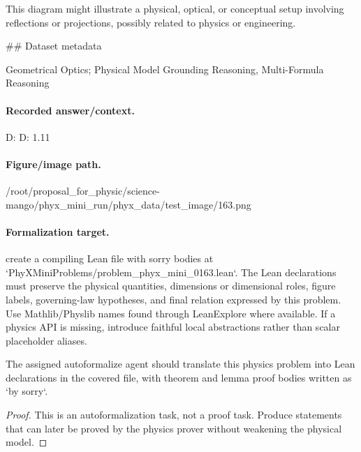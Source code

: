 This diagram might illustrate a physical, optical, or conceptual setup involving reflections or projections, possibly related to physics or engineering.

\#\# Dataset metadata

Geometrical Optics; Physical Model Grounding Reasoning, Multi-Formula Reasoning

\paragraph{Recorded answer/context.}
D: D: 1.11

\paragraph{Figure/image path.}
/root/proposal\_for\_physic/science-mango/phyx\_mini\_run/phyx\_data/test\_image/163.png

\paragraph{Formalization target.}
create a compiling Lean file with sorry bodies at `PhyXMiniProblems/problem\_phyx\_mini\_0163.lean`. The Lean declarations must preserve the physical quantities, dimensions or dimensional roles, figure labels, governing-law hypotheses, and final relation expressed by this problem.
Use Mathlib/Physlib names found through LeanExplore where available. If a physics API is missing, introduce faithful local abstractions rather than scalar placeholder aliases.

\begin{theorem}
\label{thm:physics:phyx_mini_0163:target}
The assigned autoformalize agent should translate this physics problem into Lean declarations in the covered file, with theorem and lemma proof bodies written as `by sorry`.
\end{theorem}
\begin{proof}
This is an autoformalization task, not a proof task. Produce statements that can later be proved by the physics prover without weakening the physical model.
\end{proof}

